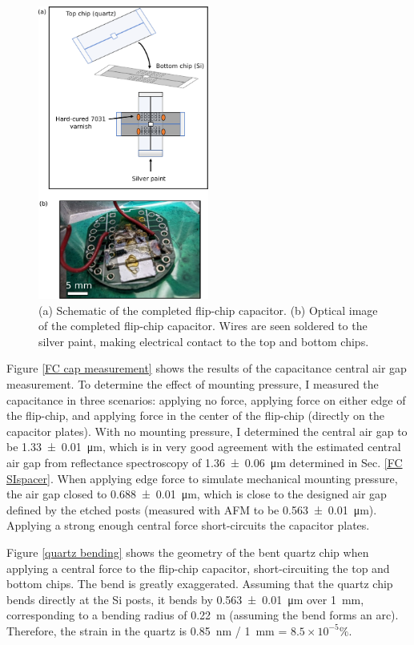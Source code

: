 \documentclass[double,12pt,1in]{beavtex}
\begin{document}
\begin{figure}
    \includegraphics[width=0.5\textwidth]{flipping chips.pdf}
    \caption{(a) Schematic of the completed flip-chip capacitor. (b) Optical image of the completed flip-chip capacitor. Wires are seen soldered to the silver paint, making electrical contact to the top and bottom chips.}
    \label{flipping chips}
\end{figure}

Figure \ref{FC cap measurement} shows the results of the capacitance central air gap measurement. To determine the effect of mounting pressure, I measured the capacitance in three scenarios: applying no force, applying force on either edge of the flip-chip, and applying force in the center of the flip-chip (directly on the capacitor plates). With no mounting pressure, I determined the central air gap to be \SI{1.33(1)}{\micro\meter}, which is in very good agreement with the estimated central air gap from reflectance spectroscopy of \SI{1.36(6)}{\micro\meter} determined in Sec. \ref{FC SIspacer}. When applying edge force to simulate mechanical mounting pressure, the air gap closed to  \SI{0.688(10)}{\micro\meter}, which is close to the designed air gap defined by the etched posts (measured with AFM to be \SI{0.563(10)}{\micro\meter}). Applying a strong enough central force short-circuits the capacitor plates. 

Figure \ref{quartz bending} shows the geometry of the bent quartz chip when applying a central force to the flip-chip capacitor, short-circuiting the top and bottom chips. The bend is greatly exaggerated. Assuming that the quartz chip bends directly at the Si posts, it bends by \SI{0.563(10)}{\micro\meter} over \SI{1}{\milli\meter}, corresponding to a bending radius of \SI{0.22}{\meter} (assuming the bend forms an arc). Therefore, the strain in the quartz is \SI{0.85}{\nano\meter} / \SI{1}{\milli\meter} = $8.5 \times 10^{-5} \% $.
\end{document}
